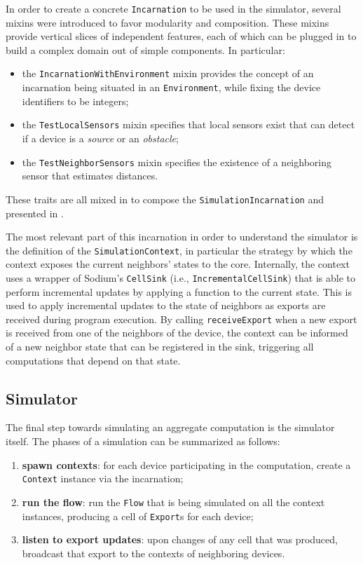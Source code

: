 In order to create a concrete \texttt{Incarnation} to be used in the simulator, several mixins were introduced to favor modularity and composition.
%
These mixins provide vertical slices of independent features, each of which can be plugged in to build a complex domain out of simple components.
%
In particular:
%
\begin{itemize}
	\item the \texttt{IncarnationWithEnvironment} mixin provides the concept of an incarnation being situated in an \texttt{Environment}, while fixing the device identifiers to be integers;
	\item the \texttt{TestLocalSensors} mixin specifies that local sensors exist that can detect if a device is a \textit{source} or an \textit{obstacle};
	\item the \texttt{TestNeighborSensors} mixin specifies the existence of a neighboring sensor that estimates distances.
\end{itemize}
%
These traits are all mixed in to compose the \texttt{SimulationIncarnation} and presented in .
%

%
The most relevant part of this incarnation in order to understand the simulator is the definition of the \texttt{SimulationContext}, in particular the strategy by which the context exposes the current neighbors' states to the core.
%
Internally, the context uses a wrapper of Sodium's \texttt{CellSink} (i.e., \texttt{IncrementalCellSink}) that is able to perform incremental updates by applying a function to the current state.
%
This is used to apply incremental updates to the state of neighbors as exports are received during program execution.
%
By calling \texttt{receiveExport} when a new export is received from one of the neighbors of the device, the context can be informed of a new neighbor state that can be registered in the sink, triggering all computations that depend on that state.

\subsection{Simulator}
\label{sec:simulator}

The final step towards simulating an aggregate computation is the simulator itself.
%
The phases of a simulation can be summarized as follows:
%
\begin{enumerate}
	\item \textbf{spawn contexts}: for each device participating in the computation, create a \texttt{Context} instance via the incarnation;
	\item \textbf{run the flow}: run the \texttt{Flow} that is being simulated on all the context instances, producing a cell of \texttt{Export}s for each device;
	\item \textbf{listen to export updates}: upon changes of any cell that was produced, broadcast that export to the contexts of neighboring devices.
\end{enumerate}

